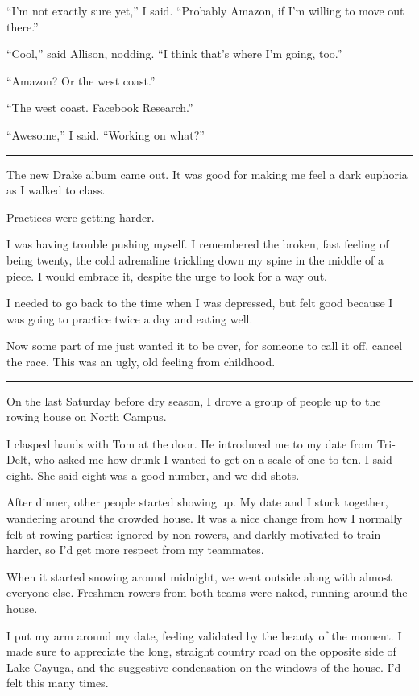 ``I'm not exactly sure yet,'' I said.  ``Probably Amazon, if I'm willing to move
out there.''

``Cool,'' said Allison, nodding.  ``I think that's where I'm going, too.''

``Amazon?  Or the west coast.''

``The west coast.  Facebook Research.''

``Awesome,'' I said.  ``Working on what?''

\plainfancybreak{12pt}{2}{}

The new Drake album came out.  It was good for making me feel a dark euphoria
as I walked to class.

Practices were getting harder.

I was having trouble pushing myself.  I remembered the broken, fast feeling of
being twenty, the cold adrenaline trickling down my spine in the middle of a
piece.  I would embrace it, despite the urge to look for a way out.  

I needed to go back to the time when I was depressed, but felt good because I
was going to practice twice a day and eating well.

Now some part of me just wanted it to be over, for someone to call it off,
cancel the race.  This was an ugly, old feeling from childhood. 

\plainfancybreak{12pt}{2}{}

On the last Saturday before dry season, I drove a group of people up to the
rowing house on North Campus.

I clasped hands with Tom at the door.  He introduced me to my date from
Tri-Delt, who asked me how drunk I wanted to get on a scale of one to ten. I
said eight.  She said eight was a good number, and we did shots.  

After dinner, other people started showing up.  My date and I stuck together,
wandering around the crowded house.  It was a nice change from how I normally
felt at rowing parties: ignored by non-rowers, and darkly motivated to train
harder, so I'd get more respect from my teammates.

When it started snowing around midnight, we went outside along with almost
everyone else.  Freshmen rowers from both teams were naked, running around the
house.

I put my arm around my date, feeling validated by the beauty of the moment.  I
made sure to appreciate the long, straight country road on the opposite side of
Lake Cayuga, and the suggestive condensation on the windows of the house.  I'd
felt this many times. 

